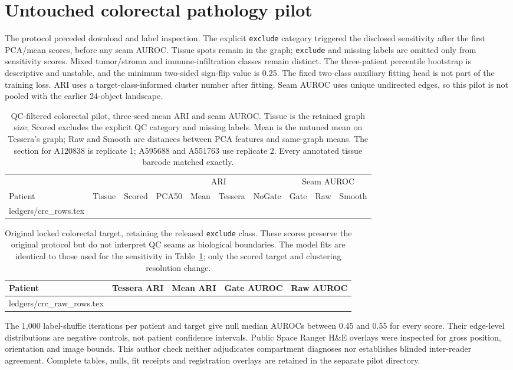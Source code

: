 \documentclass[11pt]{article}
\makeatletter
\let\tableinput\@@input
\makeatother
\begin{document}
\section*{Untouched colorectal pathology pilot}
The protocol preceded download and label inspection. The explicit \texttt{exclude} category triggered the disclosed sensitivity after the first PCA/mean scores, before any seam AUROC. Tissue spots remain in the graph; \texttt{exclude} and missing labels are omitted only from sensitivity scores. Mixed tumor/stroma and immune-infiltration classes remain distinct. The three-patient percentile bootstrap is descriptive and unstable, and the minimum two-sided sign-flip value is 0.25. The fixed two-class auxiliary fitting head is not part of the training loss. ARI uses a target-class-informed cluster number after fitting. Seam AUROC uses unique undirected edges, so this pilot is not pooled with the earlier 24-object landscape.
\begin{table}[H]\centering\scriptsize\setlength{\tabcolsep}{3.5pt}
\caption{QC-filtered colorectal pilot, three-seed mean ARI and seam AUROC. Tissue is the retained graph size; Scored excludes the explicit QC category and missing labels. Mean is the untuned mean on Tessera's graph; Raw and Smooth are distances between PCA features and same-graph means. The section for A120838 is replicate 1; A595688 and A551763 use replicate 2. Every annotated tissue barcode matched exactly.}\label{tab:crc-pilot}
\begin{tabular}{lrrrrrrrrr}\toprule
& & & \multicolumn{4}{c}{ARI} & \multicolumn{3}{c}{Seam AUROC}\\\cmidrule(lr){4-7}\cmidrule(lr){8-10}
Patient & Tissue & Scored & PCA50 & Mean & Tessera & NoGate & Gate & Raw & Smooth\\\midrule
\tableinput ledgers/crc_rows.tex
\bottomrule\end{tabular}\end{table}
\begin{table}[H]\centering\small\setlength{\tabcolsep}{6pt}
\caption{Original locked colorectal target, retaining the released \texttt{exclude} class. These scores preserve the original protocol but do not interpret QC seams as biological boundaries. The model fits are identical to those used for the sensitivity in Table~\ref{tab:crc-pilot}; only the scored target and clustering resolution change.}\label{tab:crc-original}
\begin{tabular}{lrrrr}\toprule
Patient & Tessera ARI & Mean ARI & Gate AUROC & Raw AUROC\\\midrule
\tableinput ledgers/crc_raw_rows.tex
\bottomrule\end{tabular}\end{table}
The 1,000 label-shuffle iterations per patient and target give null median AUROCs between 0.45 and 0.55 for every score. Their edge-level distributions are negative controls, not patient confidence intervals. Public Space Ranger H\&E overlays were inspected for gross position, orientation and image bounds. This author check neither adjudicates compartment diagnoses nor establishes blinded inter-reader agreement. Complete tables, nulls, fit receipts and registration overlays are retained in the separate pilot directory.
\end{document}
